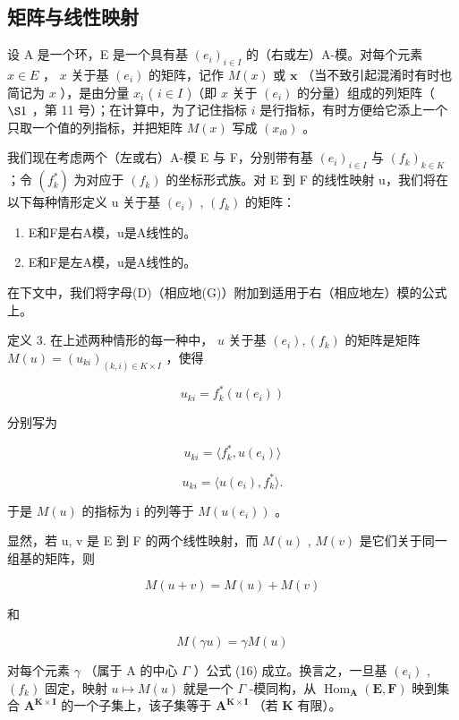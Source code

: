 \subsection{矩阵与线性映射}

设 A 是一个环，E 是一个具有基 \((e_i)_{i\in I}\) 的（右或左）A-模。对每个元素 \(x\in E\) ， \(x\) 关于基 \((e_i)\) 的矩阵，记作 \(M(x)\) 或 \(\mathbf{x}\) （当不致引起混淆时有时也简记为 \(x\) ），是由分量 \(x_i\) ( \(i\in I\) )（即 \(x\) 关于 \((e_i)\) 的分量）组成的列矩阵（ \(\S 1\) ，第 11 号）；在计算中，为了记住指标 \(i\) 是行指标，有时方便给它添上一个只取一个值的列指标，并把矩阵 \(M(x)\) 写成 \((x_{i0})\) 。

我们现在考虑两个（左或右）A-模 E 与 F，分别带有基 \((e_{i})_{i\in I}\) 与 \((f_{k})_{k\in K}\) ；令 \((f_{k}^{*})\) 为对应于 \((f_{k})\) 的坐标形式族。对 E 到 F 的线性映射 u，我们将在以下每种情形定义 u 关于基 \((e_{i})\) , \((f_{k})\) 的矩阵：

\begin{enumerate}
\def\labelenumi{(\Alph{enumi})}
\setcounter{enumi}{3}
\item
  E和F是右A模，u是A线性的。
\item
  E和F是左A模，u是A线性的。
\end{enumerate}

在下文中，我们将字母(D)（相应地(G)）附加到适用于右（相应地左）模的公式上。

定义 3. 在上述两种情形的每一种中， \(u\) 关于基 \((e_i), (f_k)\) 的矩阵是矩阵 \(M(u) = (u_{ki})_{(k,i) \in K \times I}\) ，使得

\[
u _ {k i} = f _ {k} ^ {*} (u (e _ {i}))\tag{14}
\]

分别写为

\[
u _ {k i} = \langle f _ {k} ^ {*}, u (e _ {i}) \rangle\tag{14 D}
\]

\[
u _ {k i} = \langle u (e _ {i}), f _ {k} ^ {*} \rangle .\tag{14 G}
\]

于是 \(M(u)\) 的指标为 i 的列等于 \(M(u(e_{i}))\) 。

显然，若 u, v 是 E 到 F 的两个线性映射，而 \(M(u)\) , \(M(v)\) 是它们关于同一组基的矩阵，则

\[
M (u + v) = M (u) + M (v)\tag{15}
\]

和

\[
M (\gamma u) = \gamma M (u)\tag{16}
\]

对每个元素 \(\gamma\) （属于 A 的中心 \(\Gamma\) ）公式 (16) 成立。换言之，一旦基 \((e_i)\) , \((f_k)\) 固定，映射 \(u \mapsto M(u)\) 就是一个 \(\Gamma\) -模同构，从 \(\operatorname{Hom}_{\mathbf{A}}(\mathbf{E}, \mathbf{F})\) 映到集合 \(\mathbf{A}^{\mathbf{K} \times \mathbf{I}}\) 的一个子集上，该子集等于 \(\mathbf{A}^{\mathbf{K} \times \mathbf{I}}\) （若 \(\mathbf{K}\) 有限）。

